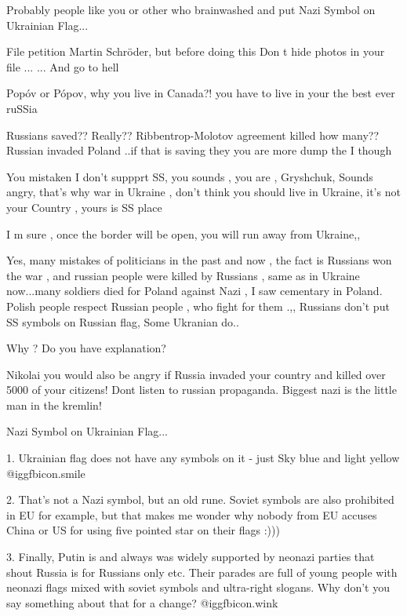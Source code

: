 \begin{itemize}
\begin{itemize}
Probably people like you or other who brainwashed and put Nazi Symbol on
Ukrainian Flag...

File petition Martin Schröder, but before doing this Don t hide photos in your file ...
... And go to hell

Popóv or Pópov, why you live in Canada?! you have to live in your the best ever ruSSia


Russians saved?? Really?? Ribbentrop-Molotov agreement killed how many?? Russian invaded Poland ..if that is saving they you are more dump the I though

You mistaken I don't suppprt SS, you sounds , you are , Gryshchuk,
Sounds angry, that's why war in Ukraine , don't think you should live in Ukraine, it's not your Country , yours is SS place

I m sure , once the border will be open, you will run away from Ukraine,,


Yes, many mistakes of politicians in the past and now , the fact is Russians
won the war , and russian people were killed by Russians , same as in Ukraine
now...many soldiers died for Poland against Nazi , I saw cementary in Poland.
Polish people respect Russian people , who fight for them .,, Russians don't
put SS symbols on Russian flag, Some Ukranian do..

Why ? Do you have explanation?



Nikolai you would also be angry if Russia invaded your country and killed over 5000 of your citizens!
Dont listen to russian propaganda.
Biggest nazi is the little man in the kremlin!


Nazi Symbol on Ukrainian Flag...

1. Ukrainian flag does not have any symbols on it - just Sky blue and light
yellow  @igg{fbicon.smile} 

2. That's not a Nazi symbol, but an old rune. Soviet symbols are also
prohibited in EU for example, but that makes me wonder why nobody from EU
accuses China or US for using five pointed star on their flags :)))

3. Finally, Putin is and always was widely supported by neonazi parties that
shout Russia is for Russians only etc. Their parades are full of young people
with neonazi flags mixed with soviet symbols and ultra-right slogans. Why don't
you say something about that for a change?  @igg{fbicon.wink} 



\end{itemize}
\end{itemize}
